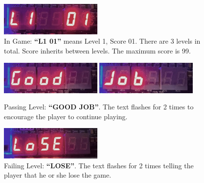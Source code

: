 \documentclass[conference]{IEEEtran}
\begin{document}
\begin{figure}[h] %
    \centering
    \includegraphics[width=0.45\textwidth]{imageset/level}
    \caption{In Game: \textbf{``L1 01''} means Level 1, Score 01. There are 3 levels in total. Score inherits between levels. The maximum score is 99.}
    \label{fig_in_game}
\end{figure}

\begin{figure}[h] %
    \centering
    \includegraphics[width=0.45\textwidth]{imageset/good}
    \includegraphics[width=0.45\textwidth]{imageset/job}
    \caption{Passing Level: \textbf{``GOOD JOB''}. The text flashes for 2 times to encourage the player to continue playing.}
    \label{fig_win}
\end{figure}

\begin{figure}[h] %
    \centering
    \includegraphics[width=0.45\textwidth]{imageset/lose}
    \caption{Failing Level: \textbf{``LOSE''}. The text flashes for 2 times telling the player that he or she lose the game.}
    \label{fig_lose}
\end{figure}
\end{document}
